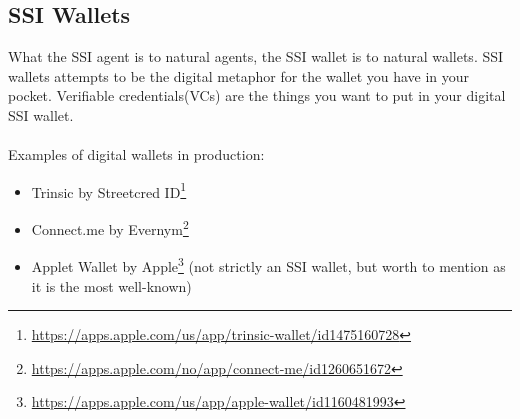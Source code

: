 \hypertarget{ssi-wallets}{%
\subsection{SSI Wallets}\label{ssi-wallets}}

What the SSI agent is to natural agents, the SSI wallet is to natural
wallets. SSI wallets attempts to be the digital metaphor for the wallet
you have in your pocket. Verifiable credentials(VCs) are the things you want
to put in your digital SSI wallet.

\paragraph{}

Examples of digital wallets in production:
\begin{itemize}
\tightlist
\item
    Trinsic by Streetcred ID\footnote{\url{https://apps.apple.com/us/app/trinsic-wallet/id1475160728}}
\item
    Connect.me by Evernym\footnote{\url{https://apps.apple.com/no/app/connect-me/id1260651672}}
\item
    Applet Wallet by Apple\footnote{\url{https://apps.apple.com/us/app/apple-wallet/id1160481993}} (not strictly an SSI wallet, but worth to mention as it is the most well-known)
\end{itemize}

